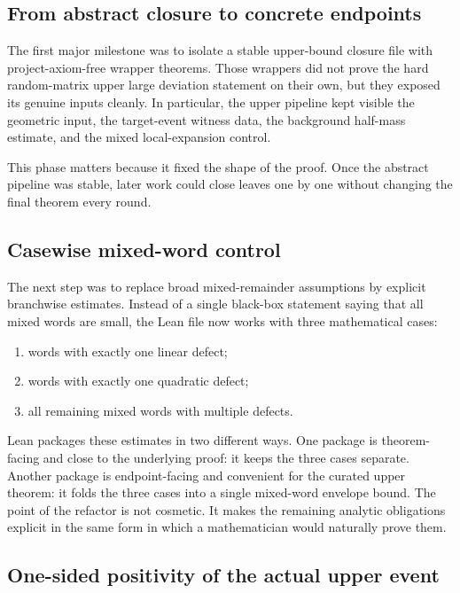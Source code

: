 \documentclass[11pt]{article}
\begin{document}
\subsection{From abstract closure to concrete endpoints}

The first major milestone was to isolate a stable upper-bound closure file with
project-axiom-free wrapper theorems.  Those wrappers did not prove the hard
random-matrix upper large deviation statement on their own, but they exposed
its genuine inputs cleanly.  In particular, the upper pipeline kept visible the
geometric input, the target-event witness data, the background half-mass
estimate, and the mixed local-expansion control.

This phase matters because it fixed the shape of the proof.  Once the abstract
pipeline was stable, later work could close leaves one by one without changing
the final theorem every round.

\subsection{Casewise mixed-word control}

The next step was to replace broad mixed-remainder assumptions by explicit
branchwise estimates.  Instead of a single black-box statement saying that all
mixed words are small, the Lean file now works with three mathematical cases:
\begin{enumerate}[leftmargin=*]
  \item words with exactly one linear defect;
  \item words with exactly one quadratic defect;
  \item all remaining mixed words with multiple defects.
\end{enumerate}

Lean packages these estimates in two different ways.  One package is
theorem-facing and close to the underlying proof: it keeps the three cases
separate.  Another package is endpoint-facing and convenient for the curated
upper theorem: it folds the three cases into a single mixed-word envelope bound.
The point of the refactor is not cosmetic.  It makes the remaining analytic
obligations explicit in the same form in which a mathematician would naturally
prove them.

\subsection{One-sided positivity of the actual upper event}
\end{document}
